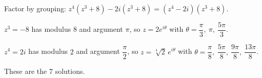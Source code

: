 Factor by grouping: $z^4(z^3+8)-2i(z^3+8)=(z^4-2i)(z^3+8)$.

$z^3=-8$ has modulus $8$ and argument $\pi$, so $z=2e^{i\theta}$ with $\theta=\dfrac\pi3,\ \pi,\ \dfrac{5\pi}3$.

$z^4=2i$ has modulus $2$ and argument $\dfrac\pi2$, so $z=\sqrt[4]2\,e^{i\theta}$ with $\theta=\dfrac\pi8,\ \dfrac{5\pi}8,\ \dfrac{9\pi}8,\ \dfrac{13\pi}8$.

These are the $\boxed{7}$ solutions.
